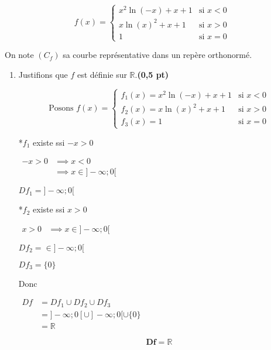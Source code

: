 \documentclass[12pt,a4paper]{article}
\begin{document}
\[
    f(x) =
    \begin{cases}
        x^2 \ln(-x) + x + 1 & \text{si } x < 0 \\
        x \ln(x)^2 + x + 1  & \text{si } x > 0 \\
        1                   & \text{si } x = 0
    \end{cases}
\]

On note \( (C_f) \) sa courbe représentative dans un repère orthonormé.

\begin{enumerate}
    \item Justifions que \( f \) est définie sur \( \mathbb{R} \).\hfill \textbf{(0,5 pt)}

		\[ \text{Posons }
    f(x) =
    \begin{cases}
        f_{1}(x)=x^2 \ln(-x) + x + 1 & \text{si } x < 0 \\
        f_{2}(x)=x \ln(x)^2 + x + 1  & \text{si } x > 0 \\
        f_{3}(x)=1                   & \text{si } x = 0
    \end{cases}
\]    
    
*\(f_{1}\) existe ssi \(-x > 0\)
    
    \(
    \begin{aligned}
    -x > 0 &\implies x < 0\\
    			 &\implies x \in]-\infty;0[
    \end{aligned}
    \)
    
    \underline{\(Df_{1} = ]-\infty;0[ \)}
    
*\(f_{2}\) existe ssi \(x > 0\)
    
    \(
    \begin{aligned}
    x > 0 &\implies x \in]-\infty;0[
    \end{aligned}
    \)
    
    \underline{\(Df_{2} = \in]-\infty;0[ \)}
    
    \underline{\(Df_{3} = \{0\} \)}
    
Donc 

\(
\begin{aligned}
Df&=Df_{1} \cup Df_{2} \cup Df_{3}\\
&=]-\infty;0[ \cup ]-\infty;0[\cup\{0\}\\
&=\mathbb{R}
\end{aligned}
\)

\begin{resultbox}
    \[
        \mathbf{Df=\mathbb{R}}
    \]
\end{resultbox} 


\end{enumerate}
\end{document}
